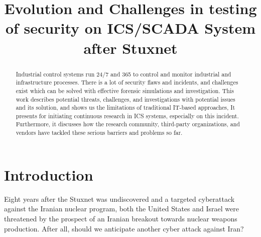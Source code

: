 \documentclass[conference]{IEEEtran}
\begin{document}
\title{Evolution and Challenges in testing of security on ICS/SCADA System after Stuxnet}

\author{
\and
{}
} 

\maketitle

\begin{abstract}
Industrial control systems run 24/7 and 365 to  control and monitor industrial and infrastructure processes. There is a lot of security flaws and incidents, and challenges exist which can be solved with effective forensic simulations and investigation. This work describes potential threats, challenges, and investigations with potential issues and its solution, and shows us the limitations of traditional IT-based approaches, It presents for initiating continuous research in ICS  systems, especially on this incident.
Furthermore,  it discusses how the research community, third-party organizations, and vendors have tackled these serious barriers and problems so far.
    
\end{abstract}

\IEEEpeerreviewmaketitle

\section{Introduction}
Eight years after the Stuxnet was undiscovered and a targeted cyberattack against the Iranian nuclear program, both the United States and Israel were threatened by the prospect of an Iranian breakout towards nuclear weapons production. After all, should we anticipate another cyber attack against Iran?
\end{document}

